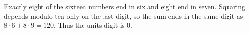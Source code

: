 Exactly eight of the sixteen numbers end in six and eight end in seven. Squaring depends modulo ten only on the last digit, so the sum ends in the same digit as $8\cdot 6+8\cdot 9=120$. Thus the units digit is $\boxed 0$.
